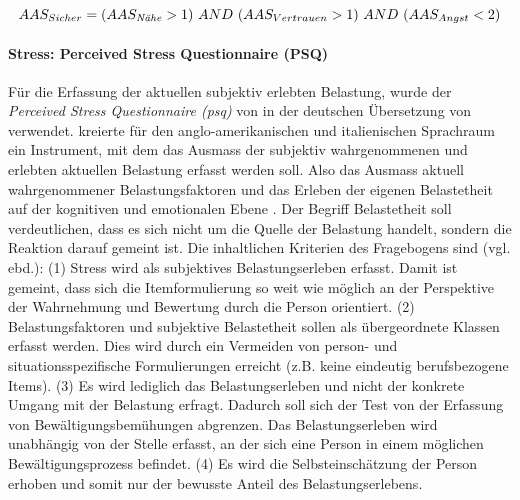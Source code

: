 \begin{equation}\label{eq:AASSicherVsUnsicher}
    AAS_{Sicher}=( AAS_{\text{\textit{N{\"a}he}}} > 1) ~AND~ (AAS_{Vertrauen} > 1) ~AND~ (AAS_{Angst} < 2)
\end{equation}

\paragraph{Stress: Perceived Stress Questionnaire (PSQ)}\label{sec:PSQ}
Für die Erfassung der aktuellen subjektiv erlebten Belastung, wurde der \textit{Perceived Stress Questionnaire (\acrshort{psq})} von  in der deutschen Übersetzung von  verwendet.
 kreierte für den anglo-amerikanischen und italienischen Sprachraum ein Instrument, mit dem das Ausmass der subjektiv wahrgenommenen und erlebten aktuellen Belastung erfasst werden soll. Also das Ausmass aktuell wahrgenommener Belastungsfaktoren und das Erleben der eigenen Belastetheit auf der kognitiven und emotionalen Ebene \cite{Fliege2001}. Der Begriff Belastetheit soll verdeutlichen, dass es sich nicht um die Quelle der Belastung handelt, sondern die Reaktion darauf gemeint ist. Die inhaltlichen Kriterien des Fragebogens sind (vgl. ebd.): (1) Stress wird als subjektives Belastungserleben erfasst. Damit ist gemeint, dass sich die Itemformulierung so weit wie möglich an der Perspektive der Wahrnehmung und Bewertung durch die Person orientiert. (2) Belastungsfaktoren und subjektive Belastetheit sollen als übergeordnete Klassen erfasst werden. Dies wird durch ein Vermeiden von person- und situationsspezifische Formulierungen erreicht (z.B. keine eindeutig berufsbezogene Items). (3) Es wird lediglich das Belastungserleben und nicht der konkrete Umgang mit der Belastung erfragt. Dadurch soll sich der Test von der Erfassung von Bewältigungsbemühungen abgrenzen. Das Belastungserleben wird unabhängig von der Stelle erfasst, an der sich eine Person in einem möglichen Bewältigungsprozess befindet. (4) Es wird die Selbsteinschätzung der Person erhoben und somit nur der bewusste Anteil des Belastungserlebens.

